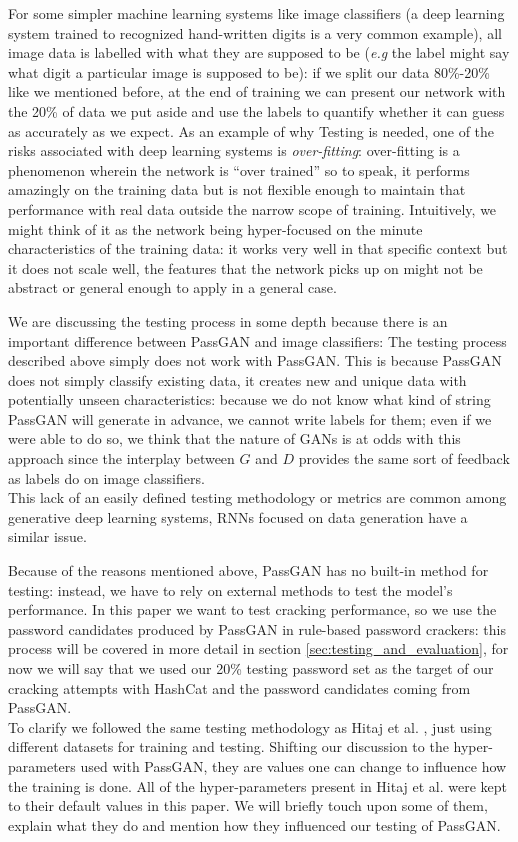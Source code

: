 For some simpler machine learning systems like image classifiers (a deep learning system trained to recognized hand-written digits is a very common example), all image data is labelled with what they are supposed to be (\emph{e.g} the label might say what digit a particular image is supposed to be): if we split our data 80\%-20\% like we mentioned before, at the end of training we can present our network with the 20\% of data we put aside and use the labels to quantify whether it can guess as accurately as we expect. As an example of why Testing is needed, one of the risks associated with deep learning systems is \emph{over-fitting}: over-fitting is a phenomenon wherein the network is \enquote{over trained} so to speak, it performs amazingly on the training data but is not flexible enough to maintain that performance with real data outside the narrow scope of training. Intuitively, we might think of it as the network being hyper-focused on the minute characteristics of the training data: it works very well in that specific context but it does not scale well, the features that the network picks up on might not be abstract or general enough to apply in a general case. 

We are discussing the testing process in some depth because there is an important difference between PassGAN and image classifiers: The testing process described above simply does not work with PassGAN.
This is because PassGAN does not simply classify existing data, it creates new and unique data with potentially unseen characteristics: because we do  not know what kind of string PassGAN will generate in advance, we cannot write labels for them; even if we were able to do so, we think that the nature of GANs is at odds with this approach since the interplay between $G$ and $D$ provides the same sort of feedback as labels do on image classifiers.\\
This lack of an easily defined testing methodology or metrics are common among generative deep learning systems, RNNs focused on data generation have a similar issue.

Because of the reasons mentioned above, PassGAN has no built-in method for testing: instead, we have to rely on external methods to test the model's performance.
In this paper we want to test cracking performance, so we use the password candidates produced by PassGAN in rule-based password crackers: this process will be covered in more detail in section \ref{sec:testing_and_evaluation}, for now we will say that we used our 20\% testing password set as the target of our cracking attempts with HashCat and the password candidates coming from PassGAN.\\
To clarify we followed the same testing methodology as Hitaj et  al. \cite{PassGAN}, just using different datasets for training and testing.
\cleardoublepage
Shifting our discussion to the hyper-parameters used with PassGAN, they are values one can change to influence how the training is done. All of the hyper-parameters present in Hitaj et al. \cite{PassGAN} were kept to their default values in this paper. We will briefly touch upon some of them, explain what they do and mention how they influenced our testing of PassGAN.

